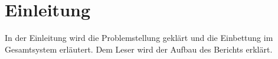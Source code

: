 \section{Einleitung}

In der Einleitung wird die Problemstellung geklärt und die Einbettung im Gesamtsystem erläutert. Dem Leser wird der Aufbau des Berichts erklärt.


